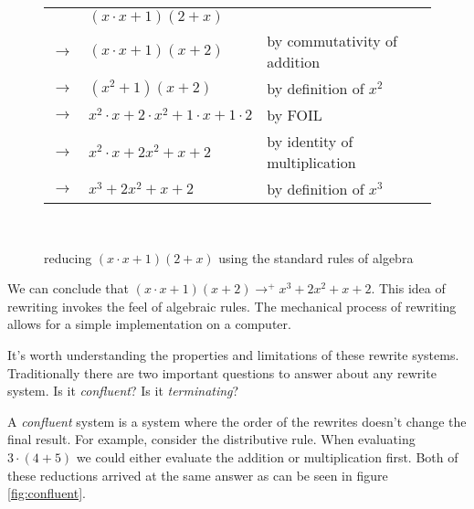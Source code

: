 \documentclass{book}
\theoremstyle{definition}
\begin{document}
\begin{figure}
\begin{tabular}{rll}
          & $(x\cdot x + 1)(2 + x)$                          & \\
    $\to$ & $(x\cdot x + 1)(x + 2)$                          & by commutativity of addition \\
    $\to$ & $(x^2 + 1)(x + 2)$                               & by definition of $x^2$\\
    $\to$ & $x^2\cdot x + 2\cdot x^2 + 1\cdot x + 1 \cdot 2$ & by FOIL\\
    $\to$ & $x^2\cdot x + 2x^2 + x + 2$                      & by identity of multiplication\\ 
    $\to$ & $x^3 + 2x^2 + x + 2$                             & by definition of $x^3$\\
\end{tabular}\\
    \caption{reducing $(x\cdot x + 1)(2 + x)$ using the standard rules of algebra}
    \label{fig:reduce}
\end{figure}

We can conclude that $(x\cdot x + 1)(x + 2) \to^+ x^3 + 2x^2 + x + 2$.
This idea of rewriting invokes the feel of algebraic rules.
The mechanical process of rewriting allows for a simple implementation on a computer.

It's worth understanding the properties and limitations of these rewrite systems.
Traditionally there are two important questions to answer about any rewrite system.
Is it \emph{confluent}? Is it \emph{terminating}?

A \emph{confluent} system is a system 
where the order of the rewrites doesn't change the final result.
For example, consider the distributive rule.
When evaluating $3\cdot(4 + 5)$ we could either evaluate the addition or multiplication first.
Both of these reductions arrived at the same answer as can be seen in figure \ref{fig:confluent}.
\end{document}
